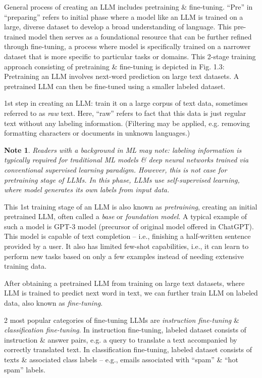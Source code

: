 \documentclass{article}
\newtheorem{note}{Note}
\begin{document}
\begin{itemize}
\begin{itemize}
		General process of creating an LLM includes pretraining \& fine-tuning. ``Pre'' in ``preparing'' refers to initial phase where a model like an LLM is trained on a large, diverse dataset to develop a broad understanding of language. This pre-trained model then serves as a foundational resource that can be further refined through fine-tuning, a process where model is specifically trained on a narrower dataset that is more specific to particular tasks or domains. This 2-stage training approach consisting of pretraining \& fine-tuning is depicted in {\sf Fig. 1.3: Pretraining an LLM involves next-word prediction on large text datasets. A pretrained LLM can then be fine-tuned using a smaller labeled dataset.}
		
		1st step in creating an LLM: train it on a large corpus of text data, sometimes referred to as {\it raw} text. Here, ``raw'' refers to fact that this data is just regular text without any labeling information. (Filtering may be applied, e.g. removing formatting characters or documents in unknown languages.)
		\begin{note}
			Readers with a background in ML may note: labeling information is typically required for traditional ML models \& deep neural networks trained via conventional supervised learning paradigm. However, this is not case for pretraining stage of LLMs. In this phase, LLMs use self-supervised learning, where model generates its own labels from input data.
		\end{note}
		This 1st training stage of an LLM is also known as {\it pretraining}, creating an initial pretrained LLM, often called a {\it base} or {\it foundation model}. A typical example of such a model is GPT-3 model (precursor of original model offered in ChatGPT). This model is capable of text completion -- i.e., finishing a half-written sentence provided by a user. It also has limited few-shot capabilities, i.e., it can learn to perform new tasks based on only a few examples instead of needing extensive training data.
		
		After obtaining a pretrained LLM from training on large text datasets, where LLM is trained to predict next word in text, we can further train LLM on labeled data, also known as {\it fine-tuning}.
		
		2 most popular categories of fine-tuning LLMs are {\it instruction fine-tuning} \& {\it classification fine-tuning}. In instruction fine-tuning, labeled dataset consists of instruction \& answer pairs, e.g. a query to translate a text accompanied by correctly translated text. In classification fine-tuning, labeled dataset consists of texts \& associated class labels -- e.g., emails associated with ``spam'' \& ``hot spam'' labels.
		

\end{itemize}
\end{itemize}
\end{document}
